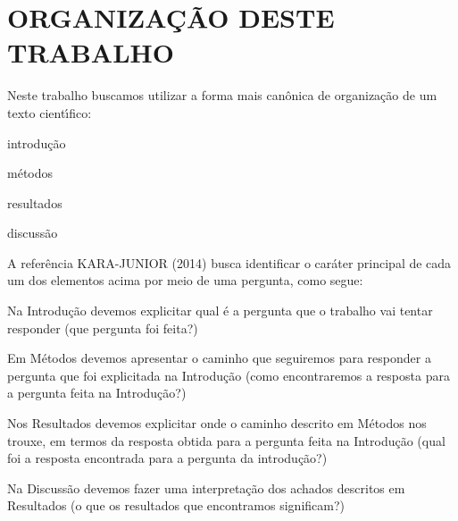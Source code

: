 \documentclass[
12pt,		%
openright,	%
twoside,  %
a4paper,			%
chapter=TITLE,		%
english,			%
french,				%
spanish,			%
brazil				%
]{USPSC-classe/USPSC}
\begin{document}
\chapter[ORGANIZA\c{C}\~AO DESTE TRABALHO]{ORGANIZA\c{C}\~AO DESTE TRABALHO}\label{ORGANIZA\c{C}\~AO DESTE TRABALHO}
Neste trabalho buscamos utilizar a forma mais can\^onica de organiza\c{c}\~ao de um texto cient\'{\i}fico:















\begin{alineas}
\item introdu\c{c}\~ao
\item m\'etodos
\item resultados
\item discuss\~ao
\end{alineas}

A refer\^encia KARA-JUNIOR (2014) busca identificar o car\'ater principal de cada um dos elementos acima por meio de uma pergunta, como segue:















\begin{alineas}
\item Na Introdu\c{c}\~ao devemos explicitar qual \'e a pergunta que o trabalho vai tentar responder   (\textquotedbl que pergunta foi feita?\textquotedbl )
\item Em M\'etodos devemos apresentar o caminho que seguiremos para responder a pergunta que foi explicitada na Introdu\c{c}\~ao (\textquotedbl como encontraremos a resposta para a pergunta feita na Introdu\c{c}\~ao?\textquotedbl )
\item Nos Resultados devemos explicitar onde o caminho descrito em M\'etodos nos trouxe, em termos da resposta obtida para a pergunta feita na Introdu\c{c}\~ao (\textquotedbl qual foi a resposta encontrada para a pergunta da introdu\c{c}\~ao?\textquotedbl )
\item Na Discuss\~ao devemos fazer uma interpreta\c{c}\~ao dos achados descritos em Resultados (\textquotedbl o que os resultados que encontramos significam?\textquotedbl )
\end{alineas}
\end{document}
